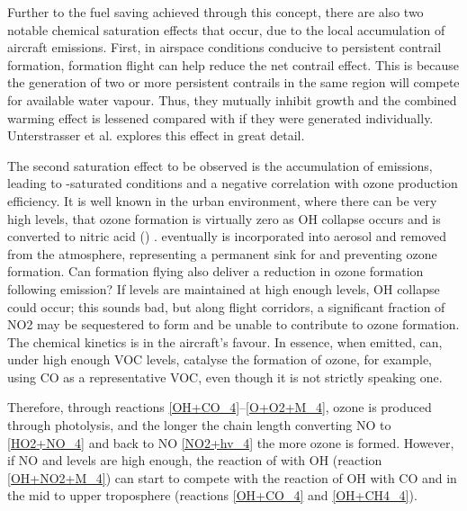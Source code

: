 Further to the fuel saving achieved through this concept, there are also two notable chemical saturation effects that occur, due to the local accumulation of aircraft emissions. First, in airspace conditions conducive to persistent contrail formation, formation flight can help reduce the net contrail effect. This is because the generation of two or more persistent contrails in the same region will compete for available water vapour. Thus, they mutually inhibit growth and the combined warming effect is lessened compared with if they were generated individually. Unterstrasser et al. \cite{Unterstrasser2020} explores this effect in great detail. 

The second saturation effect to be observed is the accumulation of  emissions, leading to -saturated conditions and a negative correlation with ozone production efficiency. It is well known in the urban environment, where there can be very high  levels, that ozone formation is virtually zero as OH collapse occurs and  is converted to nitric acid () \cite{Jenkin2002, Sillman2000}.  eventually is incorporated into aerosol and removed from the atmosphere, representing a permanent sink for  and preventing ozone formation. Can formation flying also deliver a reduction in ozone formation following  emission? If  levels are maintained at high enough levels, OH collapse could occur; this sounds bad, but along flight corridors, a significant fraction of NO2 may be sequestered to form  and be unable to contribute to ozone formation. The chemical kinetics is in the aircraft's favour. In essence, when emitted,  can, under high enough VOC levels, catalyse the formation of ozone, for example, using CO as a representative VOC, even though it is not strictly speaking one.






Therefore, through reactions \eqref{OH+CO_4}--\eqref{O+O2+M_4}, ozone is produced through  photolysis, and the longer the chain length converting NO to  \eqref{HO2+NO_4} and back to NO \eqref{NO2+hv_4} the more ozone is formed. However, if NO and  levels are high enough, the reaction of  with OH (reaction \eqref{OH+NO2+M_4}) can start to compete with the reaction of OH with CO and  in the mid to upper troposphere (reactions \eqref{OH+CO_4} and \eqref{OH+CH4_4}).

